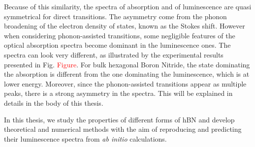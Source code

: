 Because of this similarity, the spectra of absorption and of luminescence are quasi symmetrical for direct transitions. The asymmetry come from the phonon broadening of the electron density of states, known as the Stokes shift. However when considering phonon-assisted transitions, some negligible features of the optical absorption spectra become dominant in the luminescence ones. The spectra can look very different, as illustrated by the experimental results presented in Fig. \textcolor{red}{Figure}. For bulk hexagonal Boron Nitride, the state dominating the absorption is different from the one dominating the luminescence, which is at lower energy. Moreover, since the phonon-assisted transitions appear as multiple peaks, there is a strong asymmetry in the spectra. This will be explained in details in the body of this thesis.

In this thesis, we study the properties of different forms of hBN and develop theoretical and numerical methods with the aim of reproducing and predicting their luminescence spectra from \textit{ab initio} calculations.




%
%
%
%
